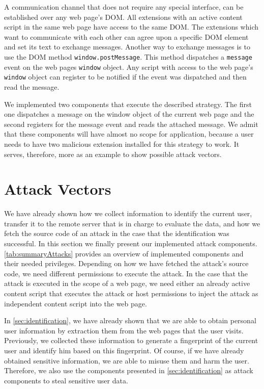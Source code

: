 	A communication channel that does not require any special interface, can be established over any web page's DOM. All extensions with an active content script in the same web page have access to the same DOM. The extensions which want to communicate with each other can agree upon a specific DOM element and set its text to exchange messages. Another way to exchange messages is to use the DOM method \texttt{window.postMessage}. This method dispatches a \texttt{message} event on the web pages \texttt{window} object. Any script with access to the web page's \texttt{window} object can register to be notified if the event was dispatched and then read the message. 
	
	We implemented two components that execute the described strategy. The first one dispatches a message on the window object of the current web page and the second registers for the message event and reads the attached message. We admit that these components will have almost no scope for application, because a user needs to have two malicious extension installed for this strategy to work. It serves, therefore, more as an example to show possible attack vectors.

\clearpage
\section{Attack Vectors}
\label{sec:execution}

	We have already shown how we collect information to identify the current user, transfer it to the remote server that is in charge to evaluate the data, and how we fetch the source code of an attack in the case that the identification was successful. In this section we finally present our implemented attack components. \autoref{tab:summaryAttacks} provides an overview of implemented components and their needed privileges. Depending on how we have fetched the attack's source code, we need different permissions to execute the attack. In the case that the attack is executed in the scope of a web page, we need either an already active content script that executes the attack or host permissions to inject the attack as independent content script into the web page.
	
	In \autoref{sec:identification}, we have already shown that we are able to obtain personal user information by extraction them from the web pages that the user visits. Previously, we collected these information to generate a fingerprint of the current user and identify him based on this fingerprint. Of course, if we have already obtained sensitive information, we are able to misuse them and harm the user. Therefore, we also use the components presented in \autoref{sec:identification} as attack components to steal sensitive user data.
	
